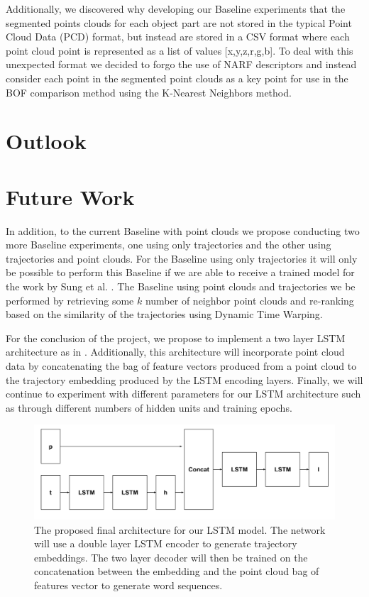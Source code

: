 \documentclass[letterpaper, 12 pt, conference]{ieeeconf}
\begin{document}
Additionally, we discovered why developing our Baseline experiments that the segmented points clouds for each object part are not stored in the typical Point Cloud Data (PCD) format, but instead are stored in a CSV format where each point cloud point is represented as a list of values [x,y,z,r,g,b]. To deal with this unexpected format we decided to forgo the use of NARF \cite{steder2010narf} descriptors and instead consider each point in the segmented point clouds as a key point for use in the BOF comparison method using the K-Nearest Neighbors method. 

\section{Outlook}

\section{Future Work}

In addition, to the current Baseline with point clouds we propose conducting two more Baseline experiments, one using only trajectories and the other using trajectories and point clouds. For the Baseline using only trajectories it will only be possible to perform this Baseline if we are able to receive a trained model for the work by Sung et al. \cite{sung2016robobarista}. The Baseline using point clouds and trajectories we be performed by retrieving some $k$ number of neighbor point clouds and re-ranking based on the similarity of the trajectories using Dynamic Time Warping.

For the conclusion of the project, we propose to implement a two layer LSTM architecture as in \cite{Venugopalan_2015_ICCV}. Additionally, this architecture will incorporate point cloud data by concatenating the bag of feature vectors produced from a point cloud to the trajectory embedding produced by the LSTM encoding layers. Finally, we will continue to experiment with different parameters for our LSTM architecture such as through different numbers of hidden units and training epochs. 

\begin{figure}[h]
\centering
\includegraphics[scale=0.15]{Tuple_LSTM}
\caption{The proposed final architecture for our LSTM model. The network will use a double layer LSTM encoder to generate trajectory embeddings. The two layer decoder will then be trained on the concatenation between the embedding and the point cloud bag of features vector to generate word sequences.}
\end{figure}
\end{document}
